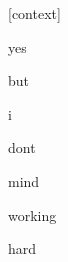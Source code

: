 \documentclass[varwidth]{standalone}
\begin{document}
\begin{CJK*}{UTF8}{gbsn}
{\setlength{\fboxsep}{0pt}\colorbox{white!0}{\parbox{0.9\textwidth}{
\colorbox{red!0.002686569932848215}{\strut [context]} \colorbox{red!0.015542736276984215}{\strut yes} \colorbox{red!0.008343717083334923}{\strut but} \colorbox{red!0.011446971446275711}{\strut i} \colorbox{red!2.9976329803466797}{\strut dont} \colorbox{red!5.4936065673828125}{\strut mind} \colorbox{red!15.652597427368164}{\strut working} \colorbox{red!75.81813049316406}{\strut hard} 
}}}
\end{CJK*}
\end{document}
